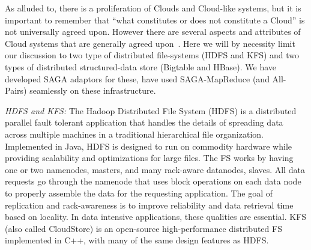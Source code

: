 \documentclass[conference,final]{IEEEtran}
\newcommand{\sagamapreduce }{SAGA-MapReduce }
\begin{document}
As alluded to, there is a proliferation of Clouds and Cloud-like
systems, but it is important to remember that ``what constitutes or
does not constitute a Cloud'' is not universally agreed upon.  However
there are several aspects and attributes of Cloud systems that are
generally agreed upon~\cite{buyya_hpcc}. %
Here we will by necessity limit our discussion to two type of
distributed file-systems (HDFS and KFS) and two types of distributed
structured-data store (Bigtable and HBase). We have developed SAGA
adaptors for these, have used \sagamapreduce (and All-Pairs)
seamlessly on these infrastructure.




{\it HDFS and KFS: }The Hadoop Distributed File System (HDFS) is a
distributed parallel fault tolerant application that handles the
details of spreading data across multiple machines in a traditional
hierarchical file organization.  %
Implemented in Java, HDFS is designed to run on commodity hardware
while providing scalability and optimizations for large files.  The FS
works by having one or two namenodes, masters, and many rack-aware
datanodes, slaves.  All data requests go through the namenode that
uses block operations on each data node to properly assemble the data
for the requesting application.  The goal of replication and
rack-awareness is to improve reliability and data retrieval time based
on locality.  In data intensive applications, these qualities are
essential. KFS (also called CloudStore) is an open-source
high-performance distributed FS implemented in C++, with many of the same
design features as HDFS.

\end{document}
